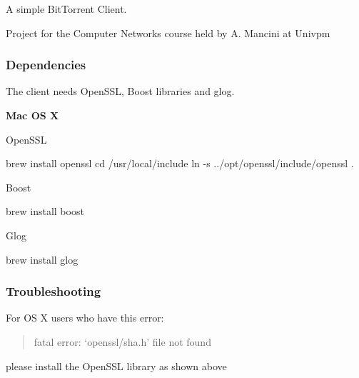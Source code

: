 A simple Bit\+Torrent Client.

Project for the Computer Networks course held by A. Mancini at Univpm

\subsubsection*{Dependencies}

The client needs Open\+S\+SL, Boost libraries and glog.

{\bfseries Mac OS X}

Open\+S\+SL 
\begin{DoxyCode}
brew install openssl
cd /usr/local/include
ln -s ../opt/openssl/include/openssl .
\end{DoxyCode}


Boost 
\begin{DoxyCode}
brew install boost
\end{DoxyCode}


Glog 
\begin{DoxyCode}
brew install glog
\end{DoxyCode}


\subsubsection*{Troubleshooting}

For OS X users who have this error\+: \begin{quote}
fatal error\+: ‘openssl/sha.h’ file not found \end{quote}


please install the Open\+S\+SL library as shown above 